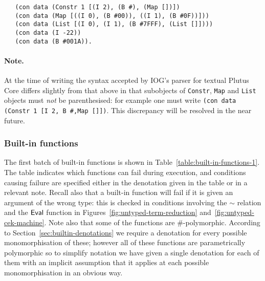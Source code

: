 \begin{verbatim}
   (con data (Constr 1 [(I 2), (B #), (Map [])]) 
   (con data (Map [((I 0), (B #00)), ((I 1), (B #0F))])) 
   (con data (List [(I 0), (I 1), (B #7FFF), (List []]))) 
   (con data (I -22)) 
   (con data (B #001A)).
\end{verbatim}

\paragraph{Note.}  At the time of writing the syntax accepted by IOG's parser for textual Plutus Core
differs slightly from that above in that subobjects
of \texttt{Constr}, \texttt{Map} and \texttt{List} objects must \textit{not} be
parenthesised: for example one must write \verb|(con data (Constr 1 [I 2, B #,Map []])|.
This discrepancy will be resolved in the near future.


\subsubsection{Built-in functions}
\label{sec:built-in-functions-1}
The first batch of built-in functions is shown in
Table~\ref{table:built-in-functions-1}.  The table indicates which functions can
fail during execution, and conditions causing failure are specified either in
the denotation given in the table or in a relevant note.  Recall also that a
built-in function will fail if it is given an argument of the wrong type: this
is checked in conditions involving the $\sim$ relation and the $\mathsf{Eval}$ function
in Figures~\ref{fig:untyped-term-reduction} and~\ref{fig:untyped-cek-machine}.
Note also that some of the functions are
\#-polymorphic.  According to Section~\ref{sec:builtin-denotations} we
require a denotation for every possible monomorphisation of these; however all
of these functions are parametrically polymorphic so to simplify notation we
have given a single denotation for each of them with an implicit assumption that
it applies at each possible monomorphisation in an obvious way.

